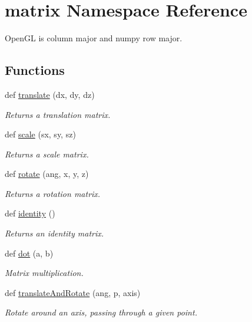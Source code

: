 \hypertarget{namespacematrix}{}\section{matrix Namespace Reference}
\label{namespacematrix}


Open\+GL is column major and numpy row major.  


\subsection*{Functions}
\begin{DoxyCompactItemize}
\item 
def \hyperlink{namespacematrix_a74da677cb3d0158ed4a2d79d15cfc478}{translate} (dx, dy, dz)
\begin{DoxyCompactList}\small\item\em Returns a translation matrix. \end{DoxyCompactList}\item 
def \hyperlink{namespacematrix_a3809ea999967baf83175d262fe553d2d}{scale} (sx, sy, sz)
\begin{DoxyCompactList}\small\item\em Returns a scale matrix. \end{DoxyCompactList}\item 
def \hyperlink{namespacematrix_a34a66c5c7a2fb2e443cb1c28b70098e5}{rotate} (ang, x, y, z)
\begin{DoxyCompactList}\small\item\em Returns a rotation matrix. \end{DoxyCompactList}\item 
def \hyperlink{namespacematrix_a3e5c0f4bcc7655342814615fa5b4bc0d}{identity} ()
\begin{DoxyCompactList}\small\item\em Returns an identity matrix. \end{DoxyCompactList}\item 
def \hyperlink{namespacematrix_a4023520a6d24b4de107acd3c284db948}{dot} (a, b)
\begin{DoxyCompactList}\small\item\em Matrix multiplication. \end{DoxyCompactList}\item 
def \hyperlink{namespacematrix_ac41a59bd795819b4d4ac63531c08371a}{translate\+And\+Rotate} (ang, p, axis)
\begin{DoxyCompactList}\small\item\em Rotate around an axis, passing through a given point. \end{DoxyCompactList}\item 

\end{DoxyCompactItemize}

